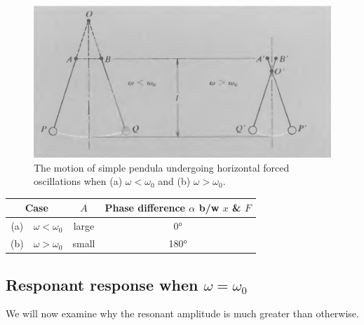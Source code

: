 \begin{figure}[h]
	\centering
	\includegraphics[scale=0.7]{phys232/Ch4-forced-no-damping-pendula.png} 
	\caption{The motion of simple pendula undergoing horizontal forced oscillations when (a) $\omega<\omega_0$ and (b) $\omega>\omega_0$.}\label{ch4:no-damping-pendula}
\end{figure}

\begin{center}
\begin{tabular}{cccc}
	\hline
	\multicolumn{2}{c}{Case} & $A$ & \parbox{3cm}{\centering Phase difference $\alpha$ b/w $x$ \& $F$}  \\
	\hline
	(a) & $\omega < \omega_0$ & large & 0° \\
	(b) & $\omega > \omega_0$ & small & 180° \\
	\hline
\end{tabular}
\end{center}


\subsection{Responant response when $\omega = \omega_0$}

We will now examine why the resonant amplitude is much greater than otherwise.

